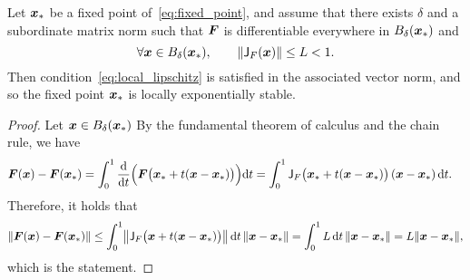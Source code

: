 \begin{proposition}
    Let $\mathbf{\boldsymbol{x}}_*$ be a fixed point of~\eqref{eq:fixed_point},
    and assume that there exists $\delta$ and a subordinate matrix norm such that
    $\mathbf{\boldsymbol{F}}$ is differentiable everywhere in $B_{\delta}(\mathbf{\boldsymbol{x}}_*)$ and
    \[
        \forall \mathbf{\boldsymbol{x}} \in B_{\delta}(\mathbf{\boldsymbol{x}}_*), \qquad
        \lVert\mathsf J_F(\mathbf{\boldsymbol{x}})\rVert \leq L < 1.
    \]
    Then condition~\eqref{eq:local_lipschitz} is satisfied in the associated vector norm,
    and so the fixed point $\mathbf{\boldsymbol{x}}_*$ is locally exponentially stable.
\end{proposition}
\begin{proof}
    Let $\mathbf{\boldsymbol{x}} \in B_{\delta}(\mathbf{\boldsymbol{x}}_*)$
    By the fundamental theorem of calculus and the chain rule,
    we have
    \begin{align*}
        \mathbf{\boldsymbol{F}}(\mathbf{\boldsymbol{x}}) - \mathbf{\boldsymbol{F}}(\mathbf{\boldsymbol{x}}_*)
        &= \int_{0}^{1} \frac{\mathrm d}{\mathrm d t} \Bigl( \mathbf{\boldsymbol{F}}\bigl(\mathbf{\boldsymbol{x}}_* + t(\mathbf{\boldsymbol{x}} - \mathbf{\boldsymbol{x}}_*) \bigr) \Bigr) \mathrm d t
        = \int_{0}^{1} \mathsf J_F\bigl(\mathbf{\boldsymbol{x}}_* + t(\mathbf{\boldsymbol{x}} - \mathbf{\boldsymbol{x}}_*)\bigr) \left(\mathbf{\boldsymbol{x}} - \mathbf{\boldsymbol{x}}_* \right) \mathrm d t.
    \end{align*}
    Therefore,
    it holds that
    \begin{align*}
        \norm{\vect F(\vect x) - \vect F(\vect x_*)}
        \leq \int_{0}^{1} \norm*{\mat J_F\bigl(\vect x + t(\vect x - \vect x_*)\bigr)}  \, \d t \, \norm{\vect x - \vect x_*}
        = \int_{0}^{1} L \, \d t \, \norm{\vect x - \vect x_*} = L \norm{\vect x - \vect x_*},
    \end{align*}
    which is the statement.
\end{proof}

